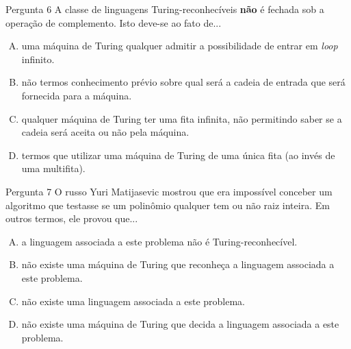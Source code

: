 \documentclass[xcolor=dvipsnames,table]{beamer}
\begin{document}
	\begin{frame}
		\begin{block}{Pergunta 6}
			A classe de linguagens Turing-reconhecíveis {\bf não} é fechada sob a operação de complemento. Isto deve-se ao fato de...
		\end{block}
		\begin{enumerate}[(A)]
			\item uma máquina de Turing qualquer admitir a possibilidade de entrar em {\it loop} infinito.
			\item não termos conhecimento prévio sobre qual será a cadeia de entrada que será fornecida para a máquina.
			\item qualquer máquina de Turing ter uma fita infinita, não permitindo saber se a cadeia será aceita ou não pela máquina.
			\item termos que utilizar uma máquina de Turing de uma única fita (ao invés de uma multifita).
		\end{enumerate}
	\end{frame}

	\begin{frame}
		\begin{block}{Pergunta 7}
			O russo Yuri Matijasevic mostrou que era impossível conceber um algoritmo que testasse se um polinômio qualquer tem ou não raiz inteira. Em outros termos, ele provou que...
		\end{block}
		\begin{enumerate}[(A)]
			\item a linguagem associada a este problema não é Turing-reconhecível. 
			\item não existe uma máquina de Turing que reconheça a linguagem associada a este problema.
			\item não existe uma linguagem associada a este problema.
			\item não existe uma máquina de Turing que decida a linguagem associada a este problema.
		\end{enumerate}
	\end{frame}
\end{document}

